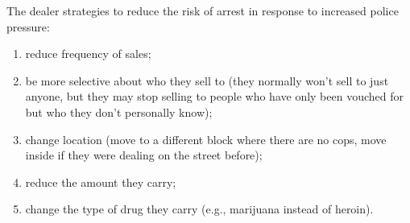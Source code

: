 \documentclass[runningheads,a4paper]{llncs}
\begin{document}


%

The dealer strategies to reduce the risk of arrest in response to increased police pressure:

\begin{enumerate}
   \item reduce frequency of sales;
   \item  be more selective about who they sell to (they normally won't sell to just anyone, but they may stop selling to people who have only been vouched for but who they don't personally know);
   \item change location (move to a different block where there are no cops, move inside if they were dealing on the street before);
   \item reduce the amount they carry;
  \item change the type of drug they carry (e.g., marijuana instead of heroin).
\end{enumerate}




\end{document}
